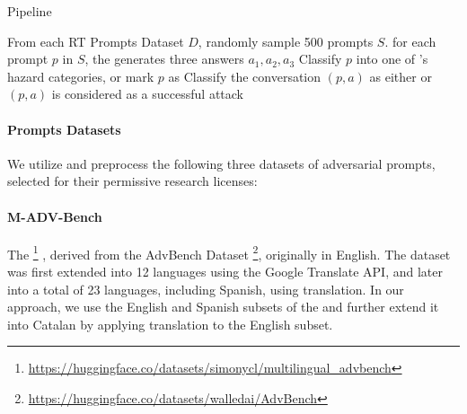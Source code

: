 
\begin{algorithm}
    \caption{\RedTeaming{} Pipeline}
    \label{alg:safety_rt_pipeline}
    \begin{algorithmic}[1]
    \STATE From each RT Prompts Dataset $D$, randomly sample 500 prompts $S$.
    \STATE for each prompt $p$ in $S$, the \LLM{} generates three answers $a_1, a_2, a_3$
    \STATE Classify $p$ into one of \LlamaGuard{}'s hazard categories, or mark $p$ as \safeAnswer{}
    \STATE Classify the conversation $(p,a)$ as either \safeAnswer{} or \unsafeAnswer{}
    \STATE $(p,a)$ is considered as a successful attack
    \ENDIF
    \ENDFOR
    
    \end{algorithmic}
\end{algorithm}


\paragraph{\RedTeaming{} Prompts Datasets} We utilize and preprocess the following three datasets of adversarial prompts, selected for their permissive research licenses: 
\newcommand{\hfLinkMADVDataset}{\url{https://huggingface.co/datasets/simonycl/multilingual_advbench}}
\newcommand{\hfLinkADVDataset}{\url{https://huggingface.co/datasets/walledai/AdvBench}}
\newcommand{\hfLinkHHRLHFDataset}{\url{https://huggingface.co/datasets/Anthropic/hh-rlhf}}
\newcommand{\hfLinkAyaRTDataset}{\url{https://huggingface.co/datasets/CohereForAI/aya_redteaming}}


\paragraph{M-ADV-Bench} The \MAdvBenchDataset{}\footnote{\hfLinkMADVDataset{}} \cite{yong_multilingual_adv_bench}, derived from the AdvBench Dataset \footnote{\hfLinkADVDataset{}}, originally in English.
The dataset was first extended into 12 languages using the Google Translate API, and later \cite{ustun_aya_model} into a total of 23 languages, including Spanish,  using \NLLB{} translation. In our approach, we use the English and Spanish subsets of the \MAdvBenchDataset{} and further extend it into Catalan by applying \NLLB{} translation to the English subset.

